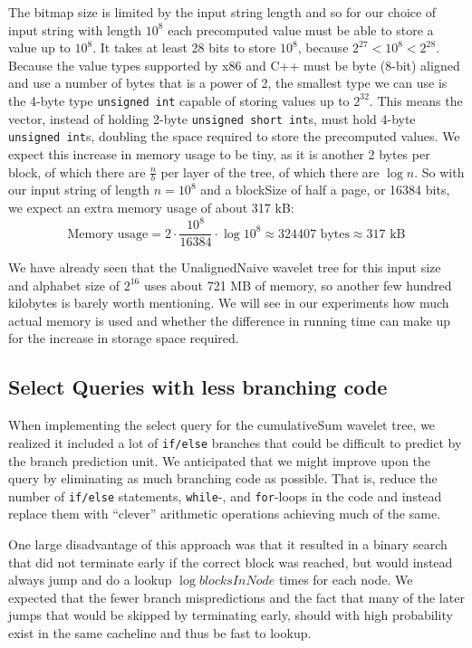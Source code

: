 The bitmap size is limited by the input string length and so for our choice of input string with length $10^8$ each precomputed value must be able to store a value up to $10^8$.
It takes at least 28 bits to store $10^8$, because $2^{27} < 10^8 < 2^{28}$.
Because the value types supported by x86 and C++ must be byte (8-bit) aligned and use a number of bytes that is a power of 2, the smallest type we can use is the 4-byte type \texttt{unsigned int} capable of storing values up to $2^{32}$.
This means the vector, instead of holding 2-byte \texttt{unsigned short int}s, must hold 4-byte \texttt{unsigned int}s, doubling the space required to store the precomputed values.
We expect this increase in memory usage to be tiny, as it is another 2 bytes per block, of which there are $\frac{n}{b}$ per layer of the tree, of which there are $\log n$.
So with our input string of length $n = 10^8$ and a blockSize of half a page, or 16384 bits, we expect an extra memory usage of about 317 kB:
\[\text{Memory usage} = 2 \cdot \frac{10^8}{16384} \cdot \log 10^8 \approx 324407 \text{ bytes} \approx 317 \text{ kB} \]

We have already seen that the UnalignedNaive wavelet tree for this input size and alphabet size of $2^{16}$ uses about 721 MB of memory, so another few hundred kilobytes is barely worth mentioning.
We will see in our experiments how much actual memory is used and whether the difference in running time can make up for the increase in storage space required.

\subsection{Select Queries with less branching code}
When implementing the select query for the cumulativeSum wavelet tree, we realized it included a lot of \texttt{if/else} branches that could be difficult to predict by the branch prediction unit.
We anticipated that we might improve upon the query by eliminating as much branching code as possible.
That is, reduce the number of \texttt{if/else} statements, \texttt{while}-, and \texttt{for}-loops in the code and instead replace them with “clever” arithmetic operations achieving much of the same.

One large disadvantage of this approach was that it resulted in a binary search that did not terminate early if the correct block was reached, but would instead always jump and do a lookup $\log \mathit{blocksInNode}$ times for each node.
We expected that the fewer branch mispredictions and the fact that many of the later jumps that would be skipped by terminating early, should with high probability exist in the same cacheline and thus be fast to lookup.

